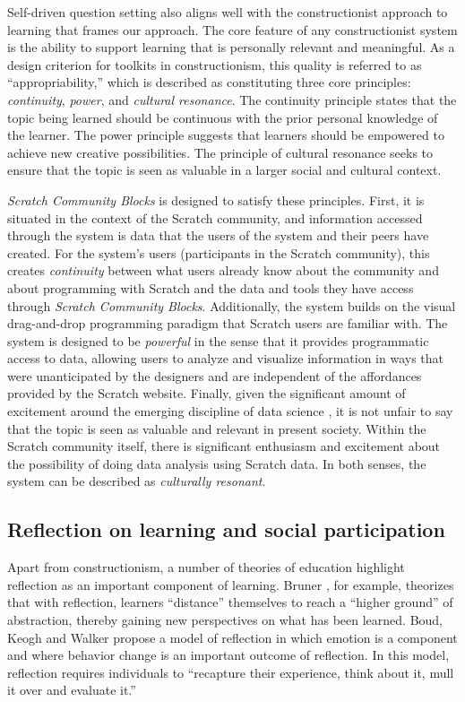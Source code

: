 \documentclass{sigchi}
\begin{document}
Self-driven question setting also aligns well with the constructionist approach to learning that frames our approach. The core feature of any constructionist system is the ability to support learning that is personally relevant and meaningful. As a design criterion for toolkits in constructionism, this quality is referred to as ``appropriability,'' \cite{papert_mindstorms:_1980} which is described as constituting three core principles: \emph{continuity}, \emph{power}, and \emph{cultural resonance}. The continuity principle states that the topic being learned should be continuous with the prior personal knowledge of the learner. The power principle suggests that learners should be empowered to achieve new creative possibilities. The principle of cultural resonance seeks to ensure that the topic is seen as valuable in a larger social and cultural context.

\emph{Scratch Community Blocks} is designed to satisfy these principles. First, it is situated in the context of the Scratch community, and information accessed through the system is data that the users of the system and their peers have created. For the system's users (participants in the Scratch community), this creates \emph{continuity} between what users already know about the community and about programming with Scratch and the data and tools they have access through \emph{Scratch Community Blocks}. Additionally, the system builds on the visual drag-and-drop programming paradigm that Scratch users are familiar with. The system is designed to be \emph{powerful} in the sense that it provides programmatic access to data, allowing users to analyze and visualize information in ways that were unanticipated by the designers and are independent of the affordances provided by the Scratch website. Finally, given the significant amount of excitement around the emerging discipline of data science \cite{podesta_big_2014}, it is not unfair to say that the topic is seen as valuable and relevant in present society. Within the Scratch community itself, there is significant enthusiasm and excitement about the possibility of doing data analysis using Scratch data. In both senses, the system can be described as \emph{culturally resonant}.

\subsection{Reflection on learning and social participation}

Apart from constructionism, a number of theories of education highlight reflection as an important component of learning. Bruner \cite{bruner_actual_1986}, for example, theorizes that with reflection, learners ``distance'' themselves to reach a ``higher ground'' of abstraction, thereby gaining new perspectives on what has been learned. Boud, Keogh and Walker \cite{boud_reflection:_1985} propose a model of reflection in which emotion is a component and where behavior change is an important outcome of reflection. In this model, reflection requires individuals to ``recapture their experience, think about it, mull it over and evaluate it.''
\end{document}
